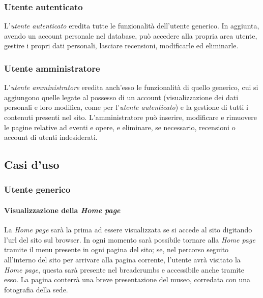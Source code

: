 \subsubsection{Utente autenticato}
\label{analisi-casi-uso-attori-principali-utente-autenticato}
L'\textit{utente autenticato} eredita tutte le funzionalità dell'utente generico. In aggiunta, avendo un account personale nel database, può accedere alla propria area utente, gestire i propri dati personali, lasciare recensioni, modificarle ed eliminarle.

\subsubsection{Utente amministratore}
\label{analisi-casi-uso-attori-principali-utente-amministratore}
L'\textit{utente amministratore} eredita anch'esso le funzionalità di quello generico, cui si aggiungono quelle legate al possesso di un account (visualizzazione dei dati personali e loro modifica, come per l'\textit{utente autenticato}) e  la gestione di tutti i contenuti presenti nel sito. L'amministratore può inserire, modificare e rimuovere le pagine relative ad eventi e opere, e eliminare, se necessario, recensioni o account di utenti indesiderati.


\subsection{Casi d'uso}
\label{analisi-casi-uso}

\subsubsection{Utente generico}
\label{analisi-casi-uso-attori-principali-utente-generico}

\paragraph{Visualizzazione della \textit{Home page}}
\label{analisi-casi-uso-attori-principali-utente-generico-1}
La \textit{Home page} sarà la prima ad essere visualizzata se si accede al sito digitando l'url del sito sul browser. In ogni momento sarà possibile tornare alla \textit{Home page} tramite il menu presente in ogni pagina del sito; se, nel percorso seguito all'interno del sito per arrivare alla pagina corrente, l'utente avrà visitato la \textit{Home page}, questa sarà presente nel breadcrumbs e accessibile anche tramite esso. La pagina conterrà una breve presentazione del museo, corredata con una fotografia della sede.


